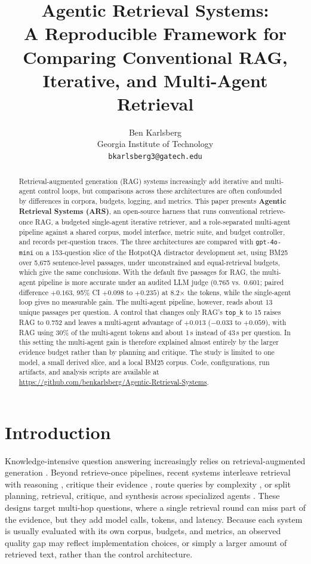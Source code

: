 \documentclass[11pt,a4paper]{article}
\title{Agentic Retrieval Systems:\\
A Reproducible Framework for Comparing Conventional RAG,\\
Iterative, and Multi-Agent Retrieval}
\author{
Ben Karlsberg\\
Georgia Institute of Technology\\
\texttt{bkarlsberg3@gatech.edu}
}
\date{}
\begin{document}
\maketitle

\begin{abstract}
Retrieval-augmented generation (RAG) systems increasingly add iterative and
multi-agent control loops, but comparisons across these architectures are
often confounded by differences in corpora, budgets, logging, and metrics.
This paper presents \textbf{Agentic Retrieval Systems (ARS)}, an open-source
harness that runs conventional retrieve-once RAG, a budgeted single-agent
iterative retriever, and a role-separated multi-agent pipeline against a
shared corpus, model interface, metric suite, and budget controller, and
records per-question traces.
The three architectures are compared with \texttt{gpt-4o-mini} on a
153-question slice of the HotpotQA distractor development set, using BM25
over 5{,}675 sentence-level passages, under unconstrained and
equal-retrieval budgets, which give the same conclusions.
With the default five passages for RAG, the multi-agent pipeline is more
accurate under an audited LLM judge (0.765 vs.\ 0.601; paired difference
$+0.163$, 95\% CI $+0.098$ to $+0.235$) at 8.2$\times$ the tokens, while the
single-agent loop gives no measurable gain.
The multi-agent pipeline, however, reads about 13 unique passages per
question.
A control that changes only RAG's \texttt{top\_k} to 15 raises RAG to 0.752
and leaves a multi-agent advantage of $+0.013$ ($-0.033$ to $+0.059$), with
RAG using 30\% of the multi-agent tokens and about 1\,s instead of 43\,s per
question.
In this setting the multi-agent gain is therefore explained almost entirely
by the larger evidence budget rather than by planning and critique.
The study is limited to one model, a small derived slice, and a local BM25
corpus.
Code, configurations, run artifacts, and analysis scripts are available at
\url{https://github.com/benkarlsberg/Agentic-Retrieval-Systems}.
\end{abstract}

\section{Introduction}
\label{sec:intro}

Knowledge-intensive question answering increasingly relies on
retrieval-augmented generation
\citep{lewis2020rag,karpukhin2020dpr,gao2023ragsurvey}.
Beyond retrieve-once pipelines, recent systems interleave retrieval with
reasoning \citep{trivedi2023ircot,jiang2023flare,yao2023react}, critique
their evidence \citep{asai2023selfrag}, route queries by complexity
\citep{jeong2024adaptiverag}, or split planning, retrieval, critique, and
synthesis across specialized agents
\citep{nguyen2025marag,singh2025agenticrag}.
These designs target multi-hop questions, where a single retrieval round can
miss part of the evidence, but they add model calls, tokens, and latency.
Because each system is usually evaluated with its own corpus, budgets, and
metrics, an observed quality gap may reflect implementation choices, or
simply a larger amount of retrieved text, rather than the control
architecture.
\end{document}
